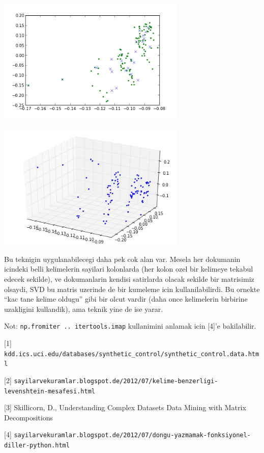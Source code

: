 \documentclass[12pt,fleqn]{article}\usepackage{../common}
\begin{document}
\includegraphics[height=6cm]{svd_5.png}

\includegraphics[height=6cm]{svd_6.png}


Bu teknigin uygulanabilecegi daha pek cok alan var. Mesela her dokumanin
icindeki belli kelimelerin sayilari kolonlarda (her kolon ozel bir kelimeye
tekabul edecek sekilde), ve dokumanlarin kendisi satirlarda olacak sekilde
bir matrisimiz olsaydi, SVD bu matris uzerinde de bir kumeleme icin
kullanilabilirdi. Bu ornekte ``kac tane kelime oldugu'' gibi bir olcut
vardir (daha once kelimelerin birbirine uzakligini kullandik), ama teknik
yine de ise yarar.

Not: \verb!np.fromiter .. itertools.imap! kullanimini anlamak
icin [4]'e bakilabilir.

[1] \verb!kdd.ics.uci.edu/databases/synthetic_control/synthetic_control.data.html!

[2] \verb!sayilarvekuramlar.blogspot.de/2012/07/kelime-benzerligi-levenshtein-mesafesi.html!

[3] Skillicorn, D., Understanding Complex Datasets Data Mining with Matrix Decompositions

[4] \verb!sayilarvekuramlar.blogspot.de/2012/07/dongu-yazmamak-fonksiyonel-diller-python.html!
\end{document}

